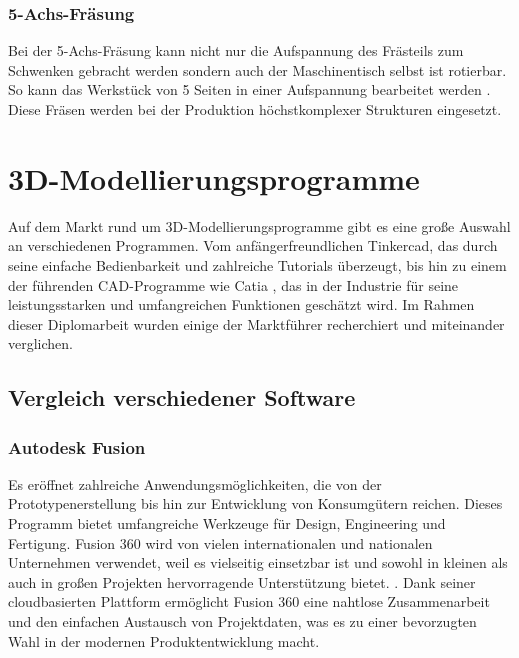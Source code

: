\subsubsection{5-Achs-Fräsung}
Bei der 5-Achs-Fräsung kann nicht nur die Aufspannung des Frästeils zum Schwenken gebracht werden sondern auch der Maschinentisch selbst ist rotierbar. So kann das Werkstück von 5 Seiten in einer Aufspannung bearbeitet werden \parencite{Fraesen345Achs}. Diese Fräsen werden bei der Produktion höchstkomplexer Strukturen eingesetzt.\\

\newpage

\section{3D-Modellierungsprogramme}
Auf dem Markt rund um 3D-Modellierungsprogramme gibt es eine große Auswahl an verschiedenen Programmen. Vom anfängerfreundlichen Tinkercad, das durch seine einfache Bedienbarkeit und zahlreiche Tutorials überzeugt, bis hin zu einem der führenden CAD-Programme wie Catia  \parencite{3DPrintingSoftware}, das in der Industrie für seine leistungsstarken und umfangreichen Funktionen geschätzt wird. \parencite{CADProgramme} Im Rahmen dieser Diplomarbeit wurden einige der Marktführer recherchiert und miteinander verglichen. \\


\subsection{Vergleich verschiedener Software}

\subsubsection{Autodesk Fusion}
Es eröffnet zahlreiche Anwendungsmöglichkeiten, die von der Prototypenerstellung bis hin zur Entwicklung von Konsumgütern reichen. Dieses Programm bietet umfangreiche Werkzeuge für Design, Engineering und Fertigung.  Fusion 360 wird von vielen internationalen und nationalen Unternehmen verwendet, weil es vielseitig einsetzbar ist und sowohl in kleinen als auch in großen Projekten hervorragende Unterstützung bietet. \parencite{AutodeskFusion}. Dank seiner cloudbasierten Plattform ermöglicht Fusion 360 eine nahtlose Zusammenarbeit und den einfachen Austausch von Projektdaten, was es zu einer bevorzugten Wahl in der modernen Produktentwicklung macht. \\

